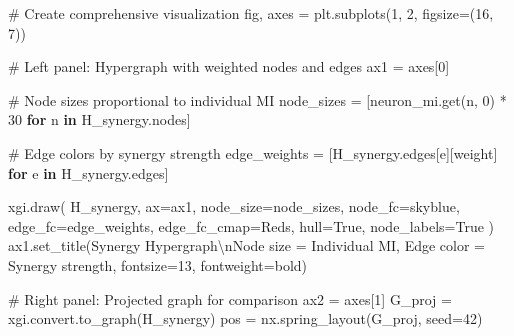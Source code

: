 \documentclass[
  11pt,
  letterpaper,
  oneside,
  openany]{book}
\newenvironment{Shaded}{\begin{snugshade}}{\end{snugshade}}
\newcommand{\CharTok}[1]{\textcolor[rgb]{0.13,0.47,0.30}{#1}}
\newcommand{\CommentTok}[1]{\textcolor[rgb]{0.37,0.37,0.37}{#1}}
\newcommand{\ControlFlowTok}[1]{\textcolor[rgb]{0.00,0.23,0.31}{\textbf{#1}}}
\newcommand{\DecValTok}[1]{\textcolor[rgb]{0.68,0.00,0.00}{#1}}
\newcommand{\KeywordTok}[1]{\textcolor[rgb]{0.00,0.23,0.31}{\textbf{#1}}}
\newcommand{\NormalTok}[1]{\textcolor[rgb]{0.00,0.23,0.31}{#1}}
\newcommand{\OperatorTok}[1]{\textcolor[rgb]{0.37,0.37,0.37}{#1}}
\newcommand{\StringTok}[1]{\textcolor[rgb]{0.13,0.47,0.30}{#1}}
\newcommand{\VariableTok}[1]{\textcolor[rgb]{0.07,0.07,0.07}{#1}}
\begin{document}
\begin{Shaded}
\begin{Highlighting}[]
\CommentTok{\# Create comprehensive visualization}
\NormalTok{fig, axes }\OperatorTok{=}\NormalTok{ plt.subplots(}\DecValTok{1}\NormalTok{, }\DecValTok{2}\NormalTok{, figsize}\OperatorTok{=}\NormalTok{(}\DecValTok{16}\NormalTok{, }\DecValTok{7}\NormalTok{))}

\CommentTok{\# Left panel: Hypergraph with weighted nodes and edges}
\NormalTok{ax1 }\OperatorTok{=}\NormalTok{ axes[}\DecValTok{0}\NormalTok{]}

\CommentTok{\# Node sizes proportional to individual MI}
\NormalTok{node\_sizes }\OperatorTok{=}\NormalTok{ [neuron\_mi.get(n, }\DecValTok{0}\NormalTok{) }\OperatorTok{*} \DecValTok{30} \ControlFlowTok{for}\NormalTok{ n }\KeywordTok{in}\NormalTok{ H\_synergy.nodes]}

\CommentTok{\# Edge colors by synergy strength}
\NormalTok{edge\_weights }\OperatorTok{=}\NormalTok{ [H\_synergy.edges[e][}\StringTok{\textquotesingle{}weight\textquotesingle{}}\NormalTok{] }\ControlFlowTok{for}\NormalTok{ e }\KeywordTok{in}\NormalTok{ H\_synergy.edges]}

\NormalTok{xgi.draw(}
\NormalTok{    H\_synergy,}
\NormalTok{    ax}\OperatorTok{=}\NormalTok{ax1,}
\NormalTok{    node\_size}\OperatorTok{=}\NormalTok{node\_sizes,}
\NormalTok{    node\_fc}\OperatorTok{=}\StringTok{\textquotesingle{}skyblue\textquotesingle{}}\NormalTok{,}
\NormalTok{    edge\_fc}\OperatorTok{=}\NormalTok{edge\_weights,}
\NormalTok{    edge\_fc\_cmap}\OperatorTok{=}\StringTok{\textquotesingle{}Reds\textquotesingle{}}\NormalTok{,}
\NormalTok{    hull}\OperatorTok{=}\VariableTok{True}\NormalTok{,}
\NormalTok{    node\_labels}\OperatorTok{=}\VariableTok{True}
\NormalTok{)}
\NormalTok{ax1.set\_title(}\StringTok{\textquotesingle{}Synergy Hypergraph}\CharTok{\textbackslash{}n}\StringTok{Node size = Individual MI, Edge color = Synergy strength\textquotesingle{}}\NormalTok{, }
\NormalTok{              fontsize}\OperatorTok{=}\DecValTok{13}\NormalTok{, fontweight}\OperatorTok{=}\StringTok{\textquotesingle{}bold\textquotesingle{}}\NormalTok{)}

\CommentTok{\# Right panel: Projected graph for comparison}
\NormalTok{ax2 }\OperatorTok{=}\NormalTok{ axes[}\DecValTok{1}\NormalTok{]}
\NormalTok{G\_proj }\OperatorTok{=}\NormalTok{ xgi.convert.to\_graph(H\_synergy)}
\NormalTok{pos }\OperatorTok{=}\NormalTok{ nx.spring\_layout(G\_proj, seed}\OperatorTok{=}\DecValTok{42}\NormalTok{)}


\end{Highlighting}
\end{Shaded}
\end{document}
